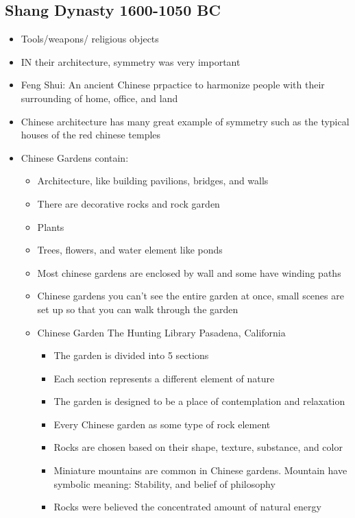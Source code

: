 \documentclass{article}
\begin{document}
\subsection{Shang Dynasty 1600-1050 BC}
\begin{itemize}
  \item Tools/weapons/ religious objects
  \item IN their architecture, symmetry was very important
  \item Feng Shui: An ancient Chinese prpactice to harmonize people
    with their surrounding of home, office, and land
  \item Chinese architecture has many great example of symmetry such as the typical
    houses of the red chinese temples
  \item Chinese Gardens contain:
    \begin{itemize}
      \item Architecture, like building pavilions, bridges, and walls
      \item There are decorative rocks and rock garden
      \item Plants
      \item Trees, flowers, and water element like ponds
      \item Most chinese gardens are enclosed by wall and some have
        winding paths
      \item Chinese gardens you can't see the entire garden at once,
        small scenes are set up so that you can walk through the garden
      \item Chinese Garden The Hunting Library Pasadena, California
        \begin{itemize}
          \item The garden is divided into 5 sections
          \item Each section represents a different element of nature
          \item The garden is designed to be a place of contemplation and relaxation
          \item Every Chinese garden as some type of rock element
          \item Rocks are chosen based on their shape, texture, substance, and color
          \item Miniature mountains are common in Chinese gardens.
            Mountain have symbolic meaning: Stability, and belief of philosophy
          \item Rocks were believed the concentrated amount of natural energy
        \end{itemize}
    \end{itemize}
\end{itemize}
\end{document}
